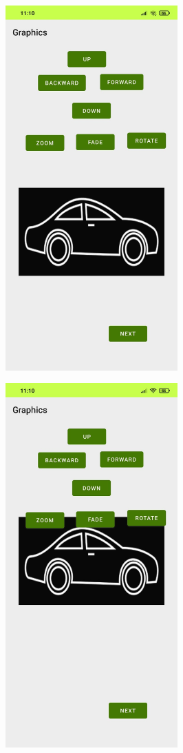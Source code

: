 \documentclass[12pt,letterpaper]{article}
\begin{document}
\newpage
\subsection*{}
\begin{figure}[h]
    \centering
    \includegraphics[height=14cm, keepaspectratio]{Outputs/OP1.png}
\end{figure}
\begin{figure}
    \centering
    \includegraphics[height=14cm, keepaspectratio]{Outputs/OP2.png}
\end{figure}
\end{document}
